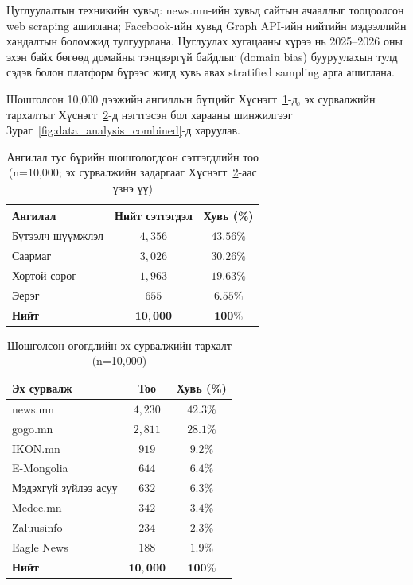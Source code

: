 Цуглуулалтын техникийн хувьд: news.mn-ийн хувьд сайтын ачааллыг тооцоолсон
web scraping ашиглана; Facebook-ийн хувьд Graph API-ийн нийтийн мэдээллийн
хандалтын боломжид тулгуурлана. Цуглуулах хугацааны хүрээ нь 2025--2026 оны эхэн
байх бөгөөд домайны тэнцвэргүй байдлыг (domain bias) бууруулахын тулд сэдэв
болон платформ бүрээс жигд хувь авах stratified sampling арга ашиглана.

Шошголсон 10,000 дээжийн ангиллын бүтцийг Хүснэгт~\ref{tab:collection}-д,
эх сурвалжийн тархалтыг Хүснэгт~\ref{tab:data_full_corpus}-д нэгтгэсэн бол
харааны шинжилгээг Зураг~\ref{fig:data_analysis_combined}-д харуулав.

\begin{table}[H]
\centering
\caption{Ангилал тус бүрийн шошгологдсон сэтгэгдлийн тоо (n=10{,}000;
  эх сурвалжийн задаргааг Хүснэгт~\ref{tab:data_full_corpus}-аас үзнэ үү)}
\label{tab:collection}
\begin{tabular}{@{}lcc@{}}
\toprule
\textbf{Ангилал} & \textbf{Нийт сэтгэгдэл} & \textbf{Хувь (\%)} \\
\midrule
Бүтээлч шүүмжлэл  & $4{,}356$ & $43.56\%$ \\
Саармаг           & $3{,}026$ & $30.26\%$ \\
Хортой сөрөг      & $1{,}963$ & $19.63\%$ \\
Эерэг             & $655$     & $6.55\%$  \\
\midrule
\textbf{Нийт}   & $\mathbf{10{,}000}$ & $\mathbf{100\%}$ \\
\bottomrule
\end{tabular}
\end{table}

\begin{table}[H]
\centering
\caption{Шошголсон өгөгдлийн эх сурвалжийн тархалт (n=10{,}000)}
\label{tab:data_full_corpus}
\begin{tabular}{@{}lcc@{}}
\toprule
\textbf{Эх сурвалж} & \textbf{Тоо} & \textbf{Хувь (\%)} \\
\midrule
news.mn                & $4{,}230$ & $42.3\%$ \\
gogo.mn                & $2{,}811$ & $28.1\%$ \\
IKON.mn                & $919$     & $9.2\%$  \\
E-Mongolia             & $644$     & $6.4\%$  \\
Мэдэхгүй зүйлээ асуу  & $632$     & $6.3\%$  \\
Medee.mn               & $342$     & $3.4\%$  \\
Zaluusinfo             & $234$     & $2.3\%$  \\
Eagle News             & $188$     & $1.9\%$  \\
\midrule
\textbf{Нийт} & $\mathbf{10{,}000}$ & $\mathbf{100\%}$ \\
\bottomrule
\end{tabular}
\end{table}

